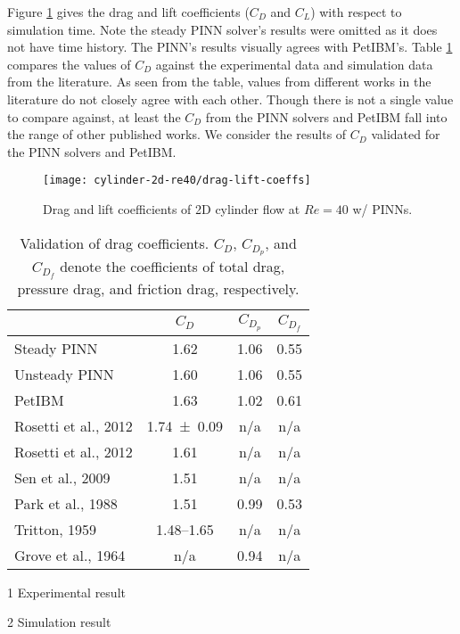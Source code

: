 Figure \ref{fig:cylinder-re40-drag-lift} gives the drag and lift coefficients ($C_D$ and $C_L$) with respect to simulation time.
Note the steady PINN solver's results were omitted as it does not have time history.
The PINN's results visually agrees with PetIBM's.
Table \ref{table:cylinder-re40-cd-comparison} compares the values of $C_D$ against the experimental data and simulation data from the literature.
As seen from the table, values from different works in the literature do not closely agree with each other.
Though there is not a single value to compare against, at least the $C_D$ from the PINN solvers and PetIBM fall into the range of other published works.
We consider the results of $C_D$ validated for the PINN solvers and PetIBM.

\begin{figure}
    \centering%
    \texttt{[image: cylinder-2d-re40/drag-lift-coeffs]}%
    \caption{%
        Drag and lift coefficients of 2D cylinder flow at $Re=\num{40}$ w/ PINNs.
    }
    \label{fig:cylinder-re40-drag-lift}%
\end{figure}

\begin{table}
    \centering%
    \begin{threeparttable}[b]
        \begin{tabular}{lccc}
            \toprule
            & $C_D$ & $C_{D_p}$ & $C_{D_f}$ \\
            \midrule
            Steady PINN & 1.62 & 1.06 & 0.55 \\
            Unsteady PINN & 1.60 & 1.06 & 0.55 \\
            PetIBM & 1.63 & 1.02 & 0.61 \\
            Rosetti et al., 2012\cite{rosetti_urans_2012}\tnote{1} & \num{1.74+-0.09} & n/a & n/a \\
            Rosetti et al., 2012\cite{rosetti_urans_2012}\tnote{2} & 1.61 & n/a & n/a \\
            Sen et al., 2009\cite{sen_steady_2009}\tnote{2} & 1.51 & n/a & n/a \\
            Park et al., 1988\cite{park_numerical_1998}\tnote{2} & 1.51 & 0.99 & 0.53 \\
            Tritton, 1959\cite{tritton_experiments_1959}\tnote{1} & 1.48--1.65 & n/a & n/a \\
            Grove et al., 1964\cite{grove_experimental_1964}\tnote{1} & n/a & 0.94 & n/a \\
            \bottomrule
        \end{tabular}%
        \begin{tablenotes}
            \footnotesize
            \item [1] Experimental result
            \item [2] Simulation result
        \end{tablenotes}
        \caption{%
            Validation of drag coefficients. %
            $C_D$, $C_{D_p}$, and $C_{D_f}$ denote the coefficients of total drag, pressure drag, %
            and friction drag, respectively.%
        }%
        \label{table:cylinder-re40-cd-comparison}
    \end{threeparttable}
\end{table}%


